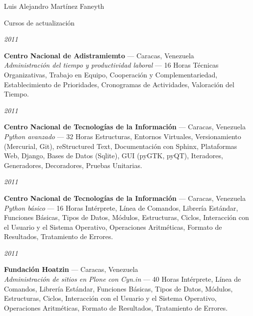 \documentclass[letterpaper]{scrartcl}
\begin{document}
\begin{cv}{Luis Alejandro Mart\'inez Faneyth}
\begin{cvlist}{Cursos de actualizaci\'on}
\item[{\parbox[t]{6em}{\textit{\large{2011}}}}]{
	\parbox[t]{\linewidth}{
		\textbf{Centro Nacional de Adistramiemto} --- Caracas, Venezuela\\
		\textit{Administración del tiempo y productividad laboral} --- 16 Horas
		\footnotesize{Técnicas Organizativas, Trabajo en Equipo, Cooperación y Complementariedad, Establecimiento de Prioridades, Cronogramas de Actividades, Valoración del Tiempo.}
	}
}
\item[{\parbox[t]{6em}{\textit{\large{2011}}}}]{
	\parbox[t]{\linewidth}{
		\textbf{Centro Nacional de Tecnologías de la Informaci\'on} --- Caracas, Venezuela\\
		\textit{Python avanzado} --- 32 Horas
		\footnotesize{Estructuras, Entornos Virtuales, Versionamiento (Mercurial, Git), reStructured Text, Documentación con Sphinx, Plataformas Web, Django, Bases de Datos (Sqlite), GUI (pyGTK, pyQT), Iteradores, Generadores, Decoradores, Pruebas Unitarias.}
	}
}
\item[{\parbox[t]{6em}{\textit{\large{2011}}}}]{
	\parbox[t]{\linewidth}{
		\textbf{Centro Nacional de Tecnologías de la Informaci\'on} --- Caracas, Venezuela\\
		\textit{Python b\'asico} --- 16 Horas
		\footnotesize{Intérprete, Línea de Comandos, Librería Estándar, Funciones Básicas, Tipos de Datos, Módulos, Estructuras, Ciclos, Interacción con el Usuario y el Sistema Operativo, Operaciones Aritméticas, Formato de Resultados, Tratamiento de Errores.}
	}
}
\item[{\parbox[t]{6em}{\textit{\large{2011}}}}]{
	\parbox[t]{\linewidth}{
		\textbf{Fundación Hoatzin} --- Caracas, Venezuela\\
		\textit{Administración de sitios en Plone con Cyn.in} --- 40 Horas
		\footnotesize{Intérprete, Línea de Comandos, Librería Estándar, Funciones Básicas, Tipos de Datos, Módulos, Estructuras, Ciclos, Interacción con el Usuario y el Sistema Operativo, Operaciones Aritméticas, Formato de Resultados, Tratamiento de Errores.}
	}
}
\end{cvlist}


\end{cv}
\end{document}
